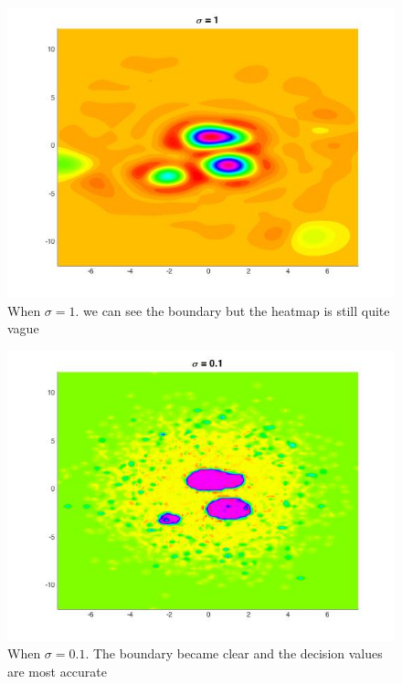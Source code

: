 \documentclass[twoside]{article}
\theoremstyle{definition}
\theoremstyle{definition}
\theoremstyle{remark}
\begin{document}
\begin{figure}[H]
\centering
\includegraphics[width=120mm]{sigma_1.jpg}
\caption{ When $\sigma = 1$. we can see the boundary but the heatmap is still quite vague\label{problem2Pic3}}
\end{figure}

\begin{figure}[H]
\centering
\includegraphics[width=120mm]{sigma_01.jpg}
\caption{ When $\sigma = 0.1$. The boundary became clear and the decision values are most accurate\label{problem2Pic4}}
\end{figure}
\end{document}
